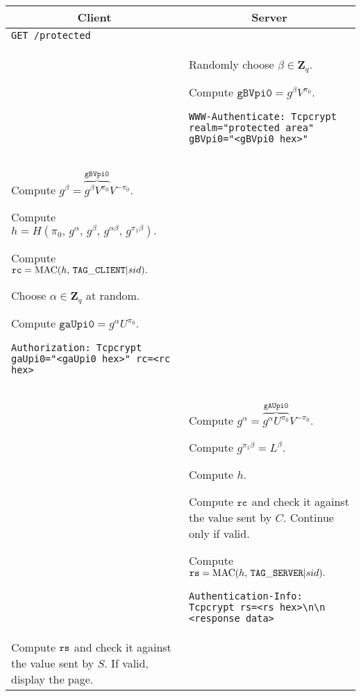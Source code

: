 \documentclass[12pt]{article}
\begin{document}
\begin{tabular}{p{9cm} | p{9cm}}
\multicolumn{1}{c}{\bf Client} & \multicolumn{1}{c}{\bf Server} \\
\hline
{\tt GET /protected} &\\

& Randomly choose $\beta \in \mathbf{Z}_q.$

Compute $\mathtt{gBVpi0}=g^\beta V^{\pi_0}.$

{\tt WWW-Authenticate: Tcpcrypt realm="protected area" gBVpi0="<gBVpi0 hex>"} \\

Compute $g^\beta = \overbrace{g^\beta V^{\pi_0}}^{\mathtt{gBVpi0}} V^{-\pi_0}.$

Compute $h = H(\pi_0,\, g^\alpha,\, g^\beta,\, g^{\alpha \beta},\, g^{\pi_1 \beta}).$

Compute ${\tt rc} = \operatorname{MAC}(h,\, {\tt TAG\_CLIENT} | sid).$

Choose $\alpha \in \mathbf{Z}_q$ at random.

Compute $\mathtt{gaUpi0}=g^\alpha U^{\pi_0}.$

{\tt Authorization: Tcpcrypt gaUpi0="<gaUpi0 hex>" rc=<rc hex>} & \\

& Compute $g^\alpha = \overbrace{g^\alpha U^{\pi_0}}^{\mathtt{gAUpi0}} V^{-\pi_0}.$

Compute $g^{\pi_1 \beta} = L^\beta.$

Compute $h$.

Compute ${\tt rc}$ and check it against the value sent by $C.$ Continue only if valid.

Compute ${\tt rs} = \operatorname{MAC}(h,\, {\tt TAG\_SERVER} | sid).$

{\tt Authentication-Info: Tcpcrypt rs=<rs hex>\textbackslash n\textbackslash n <response data>} \\

Compute ${\tt rs}$ and check it against the value sent by $S.$ If valid, display the page.
\end{tabular}
\end{document}
